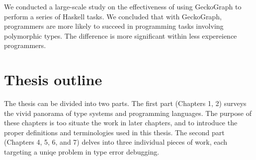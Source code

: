 We conducted a large-scale study on the effectiveness of using GeckoGraph to perform a series of Haskell tasks. We concluded that with GeckoGraph, programmers are more likely to succeed in programming tasks involving polymorphic types. The difference is more significant within less expereience programmers.










\section{Thesis outline}

The thesis can be divided into two parts. The first part (Chapters 1, 2) surveys the vivid panorama of type systems and programming languages. The purpose of these chapters is too situate the work  in later chapters, and to introduce the proper definitions and terminologies  used in this thesis.  The second part (Chapters 4, 5, 6, and 7) delves into three individual pieces of work, each targeting a uniqe problem in type error debugging.


